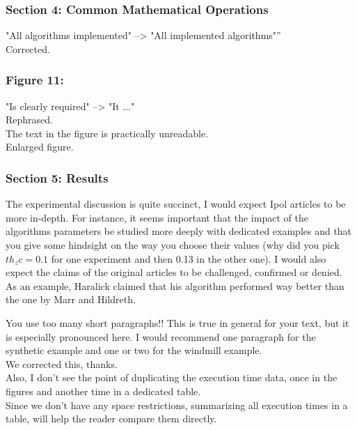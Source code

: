 \documentclass[a4paper,10pt]{report}
\begin{document}
\subsubsection{ Section 4: Common Mathematical Operations}
\que "All algorithms implemented" --> "All implemented algorithms"''\\
\ans Corrected.\\

\subsubsection{ Figure 11:}
\que "Is clearly required" --> "It ..."\\

\ans Rephrased.\\

\que The text in the figure is practically unreadable.\\
\ans Enlarged figure.\\

\subsubsection{ Section 5: Results}
The experimental discussion is quite succinct, I would expect Ipol articles to
be more in-depth. For instance, it seems important that the impact of the
algorithms parameters be studied more deeply with dedicated examples and that
you give some hindsight on the way you choose their values (why did you pick
$th_zc=0.1$ for one experiment and then 0.13 in the other one). I would
also expect the claims of the original
articles to be challenged, confirmed or denied. As an example, Haralick claimed
that his algorithm performed way better than the one by Marr and Hildreth.

\que You use too many short paragraphs!! This is true in general for your text, but
it is especially pronounced here. I would recommend one paragraph for the synthetic example and one or two for the windmill example.\\

\ans We corrected this, thanks.\\

\que Also, I don't see the point of duplicating the execution time data, once in the figures and another time in a dedicated table.\\

\ans Since we don't have any space restrictions, summarizing all execution times in a table, will help the reader compare them directly. \\
\end{document}
